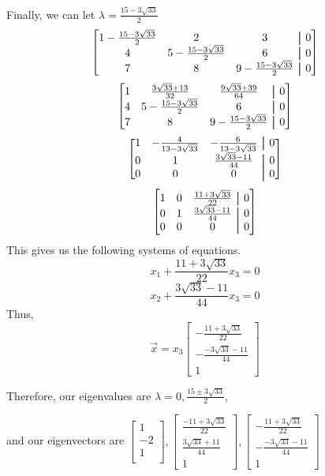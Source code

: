 \documentclass[12pt, letterpaper, twoside]{article}
\newcommand\aug{\fboxsep=-\fboxrule\!\!\!\fbox{\strut}\!\!\!} %
\begin{document}
\begin{enumerate}
Finally, we can let \(\lambda=\frac{15-3\sqrt{33}}{2}\)
\[
\begin{bmatrix}
    1-\frac{15-3\sqrt{33}}{2}&2&3&\aug&0\\
    4&5-\frac{15-3\sqrt{33}}{2}&6&\aug&0\\
    7&8&9-\frac{15-3\sqrt{33}}{2}&\aug&0
\end{bmatrix}
\]
\[
\begin{bmatrix}
    1&\frac{3\sqrt{33}+13}{32}&\frac{9\sqrt{33}+39}{64}&\aug&0\\
    4&5-\frac{15-3\sqrt{33}}{2}&6&\aug&0\\
    7&8&9-\frac{15-3\sqrt{33}}{2}&\aug&0
\end{bmatrix}
\]
\[
\begin{bmatrix}
    1&-\frac{4}{13-3\sqrt{33}}&-\frac{6}{13-3\sqrt{33}}&\aug&0\\
    0&1&\frac{3\sqrt{33}-11}{44}&\aug&0\\
    0&0&0&\aug&0
\end{bmatrix}
\]
\[
\begin{bmatrix}
    1&0&\frac{11+3\sqrt{33}}{22}&\aug&0\\
    0&1&\frac{3\sqrt{33}-11}{44}&\aug&0\\
    0&0&0&\aug&0
\end{bmatrix}
\]
This gives us the following systems of equations.
\[x_1+\frac{11+3\sqrt{33}}{22}x_3=0\]
\[x_2+\frac{3\sqrt{33}-11}{44}x_3=0\]
Thus, 
\[\vec{x}=x_3\begin{bmatrix}
    -\frac{11+3\sqrt{33}}{22}\\
    -\frac{-3\sqrt{33}-11}{44}\\
    1
\end{bmatrix}\]

Therefore, our eigenvalues are \(\lambda=0, \frac{15\pm3\sqrt{33}}{2}\), 

and our eigenvectors are 
\(\begin{bmatrix}
1\\
-2\\
1\\
\end{bmatrix}, 
\begin{bmatrix}
\frac{-11+3\sqrt{33}}{22}\\
\frac{3\sqrt{33}+11}{44}\\
1
\end{bmatrix},
\begin{bmatrix}
-\frac{11+3\sqrt{33}}{22}\\
-\frac{-3\sqrt{33}-11}{44}\\
1
\end{bmatrix}\)
\end{enumerate}
\newpage 
\end{document}
